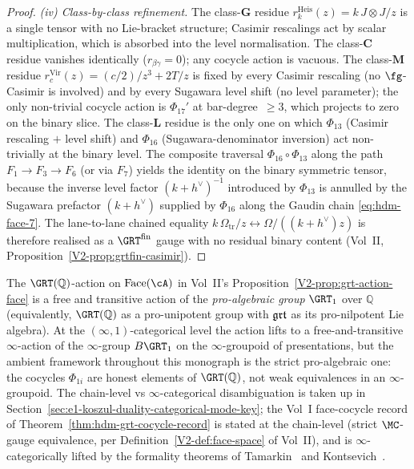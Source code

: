 \begin{proof}
\smallskip\noindent
\emph{(iv) Class-by-class refinement.} The class-$\mathbf{G}$ residue
$r^{\mathrm{Heis}}_k(z)=k\,J\otimes J/z$ is a single tensor with no Lie-bracket
structure; Casimir rescalings act by scalar multiplication, which is
absorbed into the level normalisation. The class-$\mathbf{C}$ residue
vanishes identically ($r_{\beta\gamma}=0$); any cocycle action is
vacuous. The class-$\mathbf{M}$ residue
$r^{\mathrm{Vir}}_c(z)=(c/2)/z^3+2T/z$ is fixed by every Casimir
rescaling (no $\fg$-Casimir is involved) and by every Sugawara level
shift (no level parameter); the only non-trivial cocycle action is
$\Phi_{17}'$ at bar-degree~$\geq 3$, which projects to zero on the
binary slice. The class-$\mathbf{L}$ residue is the only one on which
$\Phi_{13}$ (Casimir rescaling $+$ level shift) and $\Phi_{16}$
(Sugawara-denominator inversion) act non-trivially at the binary
level. The composite traversal $\Phi_{16}\circ\Phi_{13}$ along the
path $F_1\to F_3\to F_6$ (or via $F_7$) yields the identity on the
binary symmetric tensor, because the inverse level factor
$(k+h^\vee)^{-1}$ introduced by $\Phi_{13}$ is annulled by the
Sugawara prefactor $(k+h^\vee)$ supplied by $\Phi_{16}$ along the
Gaudin chain
\eqref{eq:hdm-face-7}. The lane-to-lane chained equality
$k\,\Omega_{\mathrm{tr}}/z\leftrightarrow\Omega/((k+h^\vee)z)$ is
therefore realised as a $\GRT^{\mathrm{fin}}$ gauge with no residual
binary content (Vol~II,
Proposition~\ref{V2-prop:grtfin-casimir}).
\end{proof}

\begin{remark}
\label{rem:hdm-grt-torsor-ambient}
The $\GRT(\mathbb{Q})$-action on $\Face(\cA)$ in
Vol~II's Proposition~\ref{V2-prop:grt-action-face} is a free and
transitive action of the \emph{pro-algebraic group} $\GRT_1$ over
$\mathbb{Q}$ (equivalently, $\GRT(\mathbb{Q})$ as a pro-unipotent
group with $\mathfrak{grt}$ as its pro-nilpotent Lie algebra). At the
$(\infty,1)$-categorical level the action lifts to a
free-and-transitive $\infty$-action of the $\infty$-group
$B\GRT_1$ on the $\infty$-groupoid of presentations, but the
ambient framework throughout this monograph is the strict
pro-algebraic one: the cocycles $\Phi_{1i}$ are honest elements of
$\GRT(\mathbb{Q})$, not weak equivalences in an
$\infty$-groupoid. The chain-level vs $\infty$-categorical
disambiguation is taken up in
Section~\ref{sec:e1-koszul-duality-categorical-mode-key}; the
Vol~I face-cocycle record of
Theorem~\ref{thm:hdm-grt-cocycle-record} is stated at the
chain-level (strict $\MC$-gauge equivalence, per
Definition~\ref{V2-def:face-space} of Vol~II), and is
$\infty$-categorically lifted by the formality theorems of
Tamarkin~\cite{Tamarkin00} and
Kontsevich~\cite{Kon03}.
\end{remark}

